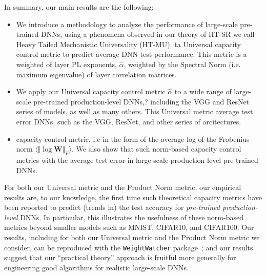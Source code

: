 In summary, our main results are the following:


\begin{itemize}
\item
We introduce a  methodology to analyze the performance of large-scale pre-trained DNNs,
using a phenomena observed in our theory of HT-SR we call Heavy Tailed Mechanistic Universality (HT-MU).
 ta Universal capacity control metric to predict average DNN test performance.
This metric is a weighted  of layer PL exponents, $\hat{\alpha}$, weighted by the Spectral Norm
(i.e. maximum eigenvalue) of layer correlation matrices. 
\item
We apply our Universal capacity control metric $\hat{\alpha}$ to a wide range of large-scale pre-trained production-level DNNs,?
 including the VGG and ResNet series of models, as well as many others.
This Universal metric  average test error  DNNs,
such as the VGG, ResNet, and other series of arcitectures.
\item
{} capacity control metric, i.e
in the form of the average log of the Frobenius norm $\langle\Vert\log\mathbf{W}\Vert_{F}\rangle$.
We also show that
such norm-based capacity control metrics  with the average test error in large-scale production-level pre-trained DNNs.
\end{itemize}



For both our Universal metric and the Product Norm metric, our empirical results are, to our knowledge, the first time such theoretical capacity metrics have been reported to predict (trends in) the test accuracy for \emph{pre-trained production-level} DNNs.
In particular, this illustrates the usefulness of these norm-based metrics beyond smaller models such as MNIST, CIFAR10, and CIFAR100. 
Our 
results, including for both our Universal metric and the Product Norm metric we consider, can be reproduced with the \texttt{WeightWatcher} package~\cite{weightwatcher_pagkage}; and our
results suggest that our ``practical theory'' approach is fruitful more generally for engineering good algorithms for realistic large-scale DNNs.


